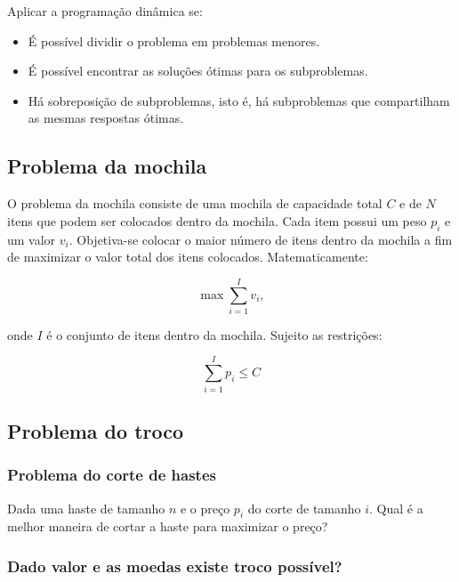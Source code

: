 \documentclass[a4paper,12pt]{article}
\begin{document}
\indent Aplicar a programação dinâmica se:

\begin{itemize}
    \item É possível dividir o problema em problemas menores.
    \item É possível encontrar as soluções ótimas para os subproblemas.
    \item Há sobreposição de subproblemas, isto é, há subproblemas que compartilham as mesmas respostas ótimas.
\end{itemize}

\subsection{Problema da mochila}

\indent O problema da mochila consiste de uma mochila de capacidade total $C$ e de $N$ itens que podem ser colocados dentro da mochila. Cada item possui um peso $p_i$ e um valor $v_i$. Objetiva-se colocar o maior número de itens dentro da mochila a fim de maximizar o valor total dos itens colocados. Matematicamente:

\begin{equation}
    \max \sum\limits_{i=1}^{I}v_i,
\end{equation}

\noindent onde $I$ é o conjunto de itens dentro da mochila. Sujeito as restrições:

\begin{equation}
    \sum\limits_{i=1}^{I}p_i \leq C
\end{equation}

\subsection{Problema do troco}

\subsubsection{Problema do corte de hastes}

Dada uma haste de tamanho $n$ e o preço $p_i$ do corte de tamanho $i$. Qual é a melhor maneira de cortar a haste para maximizar o preço?


\subsubsection{Dado valor e as moedas existe troco possível?}
\end{document}
